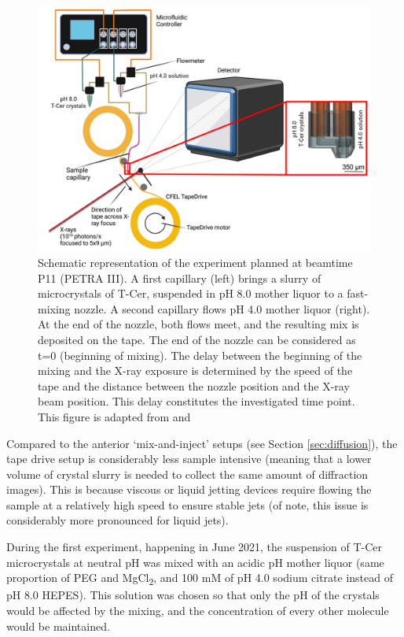 \begin{figure}[H] %
    \centering
        \noindent \includegraphics[width=\textwidth]{images/T-Cer/tape-drive_schematic.pdf}
    \hfill
    \caption{Schematic representation of the experiment planned at beamtime P11 (PETRA III). A first capillary (left) brings a slurry of microcrystals of T-Cer, suspended in pH 8.0 mother liquor to a fast-mixing nozzle. A second capillary flows pH 4.0 mother liquor (right). At the end of the nozzle, both flows meet, and the resulting mix is deposited on the tape. The end of the nozzle can be considered as t=0 (beginning of mixing). The delay between the beginning of the mixing and the X-ray exposure is determined by the speed of the tape and the distance between the nozzle position and the X-ray beam position. This delay constitutes the investigated time point. This figure is adapted from \cite{zielinskiRapidEfficientRoomtemperature2022} and \cite{henkelJINXEDJustTime2023}}
    \label{fig:tape drive}
\end{figure}

Compared to the anterior ‘mix-and-inject’ setups (see Section \ref{sec:diffusion}), the tape drive setup is considerably less sample intensive (meaning that a lower volume of crystal slurry is needed to collect the same amount of diffraction images). This is because viscous or liquid jetting devices require flowing the sample at a relatively high speed to ensure stable jets (of note, this issue is considerably more pronounced for liquid jets). 

During the first experiment, happening in June 2021, the suspension of T-Cer microcrystals at neutral pH was mixed with an acidic pH mother liquor (same proportion of PEG and MgCl\textsubscript{2}, and 100 mM of pH 4.0 sodium citrate instead of pH 8.0 HEPES). This solution was chosen so that only the pH of the crystals would be affected by the mixing, and the concentration of every other molecule would be maintained. 

